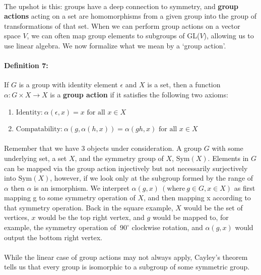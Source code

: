 \documentclass[twoside]{article}
\begin{document}
\begin{spacing}{1.25}
\paragraph*{} The upshot is this: groups have a deep connection to symmetry, and 
\textbf{group actions} acting on a set are homomorphisms from a given group into
the group of transformations of that set. 
When we can perform group actions on a vector space $V$, we 
can often map group elements to subgroups of GL($V$), allowing us to use linear algebra.
We now formalize what we mean by a `group action'.

\paragraph{\textbf{Definition 7:}} If $G$ is a group with identity element
$\epsilon$ and $X$ is a set, then a function \\ $\alpha: G \times X  \rightarrow X$
is a \textbf{group action} if it satisfies the following two axioms:
 \begin{enumerate}
  \item $\text{Identity:} \: \alpha(\epsilon, x) = x \text{ for all } x \in X$ 
  \item  $\text{Compatability:} \: \alpha(g, \alpha(h,x)) = \alpha(gh, x) \text{ for all } x \in X$
 \end{enumerate}


\paragraph*{} Remember that we have 3 objects under consideration. A group $G$ with some underlying set, a set $X$, and the symmetry group of $X$, $\text{Sym}(X)$. Elements in $G$ can be mapped via the
group action injectively but not necessarily surjectively into $\text{Sym}(X)$, however, if we 
look only at the subgroup formed by the range of $\alpha$ then $\alpha$ is an ismorphism.
We interpret $\alpha(g, x)\: 
(\text{where} \: g \in G, x \in X)$ as first mapping g to some symmetry operation of $X$, and then
mapping x according to that symmetry operation. Back in the 
square example, $X$ would be  the set of vertices, $x$ would be the top right vertex, and 
$g$ would be mapped to, for example, the symmetry operation of $\ 90^{\circ}$ clockwise rotation, and 
$\alpha(g, x)$ would output the bottom right vertex.

\paragraph*{} While the linear case of group actions may not always apply, 
Cayley's theorem tells us that every group is isomorphic to a subgroup of some 
symmetric group.


\end{spacing}
\end{document}
